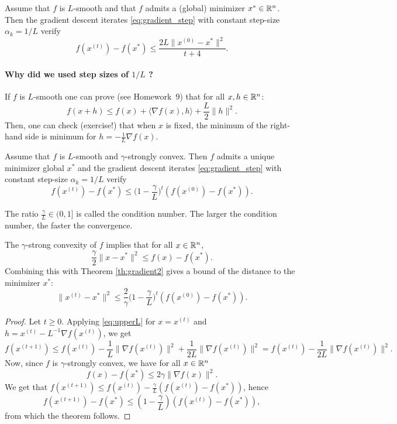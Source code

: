 \documentclass[11pt,nocut]{article}
\begin{document}
\begin{theorem}
	Assume that $f$ is $L$-smooth and that $f$ admits a (global) minimizer $x^* \in \mathbb{R}^n$. Then
	the gradient descent iterates \eqref{eq:gradient_step} with constant step-size $\alpha_k = 1/L$ verify
	$$
	f(x^{(t)}) - f(x^*) \leq \frac{2 L \| x^{(0)} - x^* \|^2}{t+4}.
	$$
\end{theorem}

\paragraph{Why did we used step sizes of $1/L$ ?} If $f$ is $L$-smooth one can prove (see Homework~9) that for all $x,h \in \mathbb{R}^n$:
\begin{equation}\label{eq:upperL}
f(x+h) \leq f(x) + \langle \nabla f(x) , h \rangle + \frac{L}{2} \|h\|^2.
\end{equation}
Then, one can check (exercise!) that when $x$ is fixed, the minimum of the right-hand side is minimum for $h = - \frac{1}{L} \nabla f(x)$.

\begin{theorem}\label{th:gradient2}
	Assume that $f$ is $L$-smooth and $\gamma$-strongly convex. 
	Then $f$ admits a unique minimizer global $x^*$ and
	the gradient descent iterates \eqref{eq:gradient_step} with constant step-size $\alpha_k = 1/L$ verify
	$$
	f(x^{(t)}) - f(x^*) \leq \Big(1-\frac{\gamma}{L}\Big)^t (f(x^{(0)}) - f(x^*)).
	$$
\end{theorem}
\begin{remark}
	The ratio $\frac{\gamma}{L} \in (0,1]$ is called the condition number. The larger the condition number, the faster the convergence.
\end{remark}
\begin{remark}
	The $\gamma$-strong convexity of $f$ implies that for all $x \in \mathbb{R}^n$,
	$$
	\frac{\gamma}{2} \|x - x^* \|^2 \leq f(x)-f(x^*).
	$$
	Combining this with Theorem \ref{th:gradient2} gives a bound of the distance to the minimizer $x^*$:
	$$
	\|x^{(t)} - x^* \|^2 \leq \frac{2}{\gamma}\Big(1-\frac{\gamma}{L}\Big)^t (f(x^{(0)}) - f(x^*)).
	$$
\end{remark}

\begin{proof}
	Let $t \geq 0$. Applying \eqref{eq:upperL} for $x=x^{(t)}$ and $h=x^{(t)} - L^{-1} \nabla f(x^{(t)})$, we get
	$$
	f(x^{(t+1)}) 
	\leq f(x^{(t)}) - \frac{1}{L} \|\nabla f(x^{(t)}) \|^2 + \frac{1}{2L}\|\nabla f(x^{(t)}) \|^2
	= f(x^{(t)}) - \frac{1}{2L} \|\nabla f(x^{(t)}) \|^2.
	$$
Now, since $f$ is $\gamma$-strongly convex, we have for all $x \in \mathbb{R}^n$
$$
f(x) - f(x^*) \leq 2 \gamma \|\nabla f(x)\|^2.
$$
We get that $f(x^{(t+1)}) \leq f(x^{(t)}) - \frac{\gamma}{L}(f(x^{(t)}) - f(x^*))$, hence
$$
f(x^{(t+1)}) - f(x^*) \leq (1 - \frac{\gamma}{L})(f(x^{(t)}) - f(x^*)),
$$
from which the theorem follows.
\end{proof}
\end{document}
